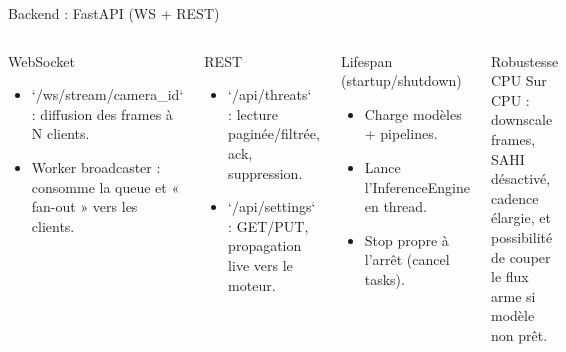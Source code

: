 \documentclass[aspectratio=169,11pt]{beamer}
\begin{document}
\begin{frame}{Backend : FastAPI (WS + REST)}
  \begin{columns}[T,onlytextwidth]
    \begin{block}{WebSocket}
      \begin{itemize}
        \item `/ws/stream/{camera_id}` : diffusion des frames à N clients.
        \item Worker broadcaster : consomme la queue et « fan-out » vers les clients.
      \end{itemize}
    \end{block}

    \begin{block}{REST}
      \begin{itemize}
        \item `/api/threats` : lecture paginée/filtrée, ack, suppression.
        \item `/api/settings` : GET/PUT, propagation live vers le moteur.
      \end{itemize}
    \end{block}

    \begin{block}{Lifespan (startup/shutdown)}
      \begin{itemize}
        \item Charge modèles + pipelines.
        \item Lance l'InferenceEngine en thread.
        \item Stop propre à l'arrêt (cancel tasks).
      \end{itemize}
    \end{block}

    \begin{alertblock}{Robustesse CPU}
      Sur CPU : downscale frames, SAHI désactivé, cadence élargie, et possibilité de couper le flux arme si modèle non prêt.
    \end{alertblock}
  \end{columns}
\end{frame}
\end{document}
